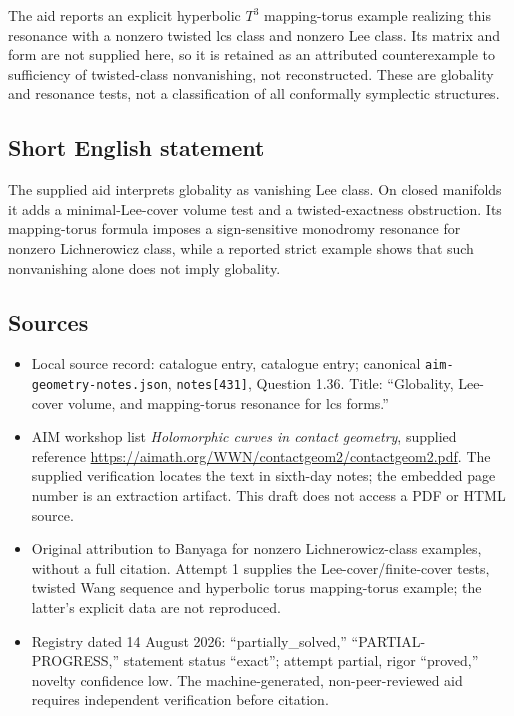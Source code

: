 \documentclass[11pt]{article}
\begin{document}
The aid reports an explicit hyperbolic \(T^3\) mapping-torus example realizing this resonance with a nonzero twisted lcs class and nonzero Lee class. Its matrix and form are not supplied here, so it is retained as an attributed counterexample to sufficiency of twisted-class nonvanishing, not reconstructed. These are globality and resonance tests, not a classification of all conformally symplectic structures.
\subsection{Short English statement}
The supplied aid interprets globality as vanishing Lee class. On closed manifolds it adds a minimal-Lee-cover volume test and a twisted-exactness obstruction. Its mapping-torus formula imposes a sign-sensitive monodromy resonance for nonzero Lichnerowicz class, while a reported strict example shows that such nonvanishing alone does not imply globality.
\subsection{Sources}
\begin{itemize}
\item Local source record: catalogue entry, catalogue entry; canonical \texttt{aim-geometry-notes.json}, \texttt{notes[431]}, Question 1.36. Title: ``Globality, Lee-cover volume, and mapping-torus resonance for lcs forms.''
\item AIM workshop list \emph{Holomorphic curves in contact geometry}, supplied reference \url{https://aimath.org/WWN/contactgeom2/contactgeom2.pdf}. The supplied verification locates the text in sixth-day notes; the embedded page number is an extraction artifact. This draft does not access a PDF or HTML source.
\item Original attribution to Banyaga for nonzero Lichnerowicz-class examples, without a full citation. Attempt 1 supplies the Lee-cover/finite-cover tests, twisted Wang sequence and hyperbolic torus mapping-torus example; the latter's explicit data are not reproduced.
\item Registry dated 14 August 2026: ``partially\_solved,'' ``PARTIAL-PROGRESS,'' statement status ``exact''; attempt partial, rigor ``proved,'' novelty confidence low. The machine-generated, non-peer-reviewed aid requires independent verification before citation.
\end{itemize}
\end{document}
